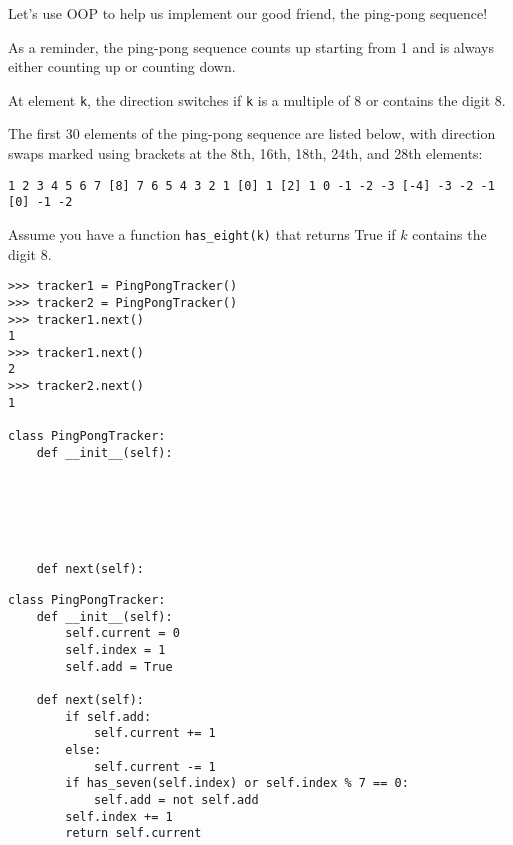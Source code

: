 \begin{blocksection}
\question Let's use OOP to help us implement our good friend, the ping-pong sequence!

As a reminder, the ping-pong sequence counts up starting from 1 and is
always either counting up or counting down.

At element \lstinline{k}, the direction switches if \lstinline{k} is a multiple of 8 or contains the
digit 8.

The first 30 elements of the ping-pong sequence are listed below, with direction
swaps marked using brackets at the 8th, 16th, 18th, 24th, and 28th
elements:
\begin{lstlisting}
1 2 3 4 5 6 7 [8] 7 6 5 4 3 2 1 [0] 1 [2] 1 0 -1 -2 -3 [-4] -3 -2 -1 [0] -1 -2
\end{lstlisting}

Assume you have a function \texttt{has\_eight(k)} that returns True if $k$ contains the digit 8.

\vspace{1\baselineskip}
\begin{lstlisting}
>>> tracker1 = PingPongTracker()
>>> tracker2 = PingPongTracker()
>>> tracker1.next()
1
>>> tracker1.next()
2
>>> tracker2.next()
1

class PingPongTracker:
    def __init__(self):






    def next(self):
\end{lstlisting}
\end{blocksection}

\begin{blocksection}
\begin{solution}[0.3in]
\begin{lstlisting}
class PingPongTracker:
    def __init__(self):
        self.current = 0
        self.index = 1
        self.add = True

    def next(self):
        if self.add:
            self.current += 1
        else:
            self.current -= 1
        if has_seven(self.index) or self.index % 7 == 0:
            self.add = not self.add
        self.index += 1
        return self.current

\end{lstlisting}
\end{solution}

\end{blocksection}

